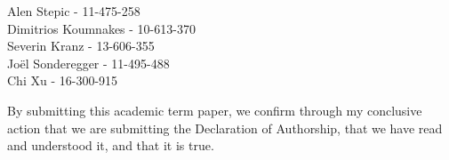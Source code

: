 \documentclass[a4paper,american,12pt]{article}
\begin{document}
\begin{flushleft}
Alen Stepic - 11-475-258\\\bigskip\bigskip  
Dimitrios Koumnakes - 10-613-370\\\bigskip\bigskip
Severin Kranz - 13-606-355\\\bigskip\bigskip
Joël Sonderegger - 11-495-488\\\bigskip\bigskip
Chi Xu - 16-300-915

By submitting this academic term paper, we confirm through my conclusive action that we are submitting the Declaration of Authorship, that we have read and understood it, and that it is true.
\end{flushleft}

\clearpage
\end{document}
